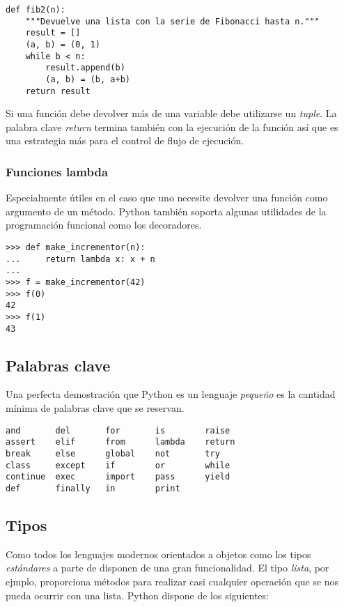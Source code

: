 \documentclass[a4paper,10pt]{article}
\begin{document}
\begin{lstlisting}
def fib2(n): 
    """Devuelve una lista con la serie de Fibonacci hasta n."""
    result = []
    (a, b) = (0, 1)
    while b < n:
        result.append(b)
        (a, b) = (b, a+b)
    return result
\end{lstlisting}

Si una función debe devolver más de una variable debe utilizarse un
\emph{tuple}.  La palabra clave \emph{return} termina también con la
ejecución de la función así que es una estrategia más para el control
de flujo de ejecución.

\subsubsection{Funciones lambda}


Especialmente útiles en el caso que uno necesite devolver una función
como argumento de un método.  Python también soporta algunas
utilidades de la programación funcional como los decoradores.
\begin{lstlisting}
>>> def make_incrementor(n):
...     return lambda x: x + n
...
>>> f = make_incrementor(42)
>>> f(0)
42
>>> f(1)
43
\end{lstlisting}

\subsection{Palabras clave}

Una perfecta demostración que Python es un lenguaje \emph{pequeño} es
la cantidad mínima de palabras clave que se reservan.

\begin{lstlisting}
and       del       for       is        raise    
assert    elif      from      lambda    return   
break     else      global    not       try      
class     except    if        or        while    
continue  exec      import    pass      yield    
def       finally   in        print
\end{lstlisting}

\subsection{Tipos}

Como todos los lenguajes modernos orientados a objetos como los tipos
\emph{estándares} a parte de disponen de una gran funcionalidad. El tipo
\emph{lista}, por ejmplo, proporciona métodos para realizar casi
cualquier operación que se nos pueda ocurrir con una lista.  Python
dispone de los siguientes:
\end{document}
